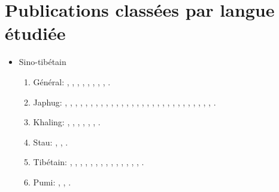 \documentclass[oneside,a4paper,11pt]{article}
\newcommand{\zh}[1]{{\cn #1}}
\newcommand{\lingua}[3]{#2}%
\begin{document}
\section{\lingua{By languages}{Publications classées par langue étudiée}{研究的语言}}
\begin{itemize}
\item \lingua{Sino-Tibetan}{Sino-tibétain}{汉藏语系}
\begin{enumerate}
\item \lingua{General}{Général}{总论}: \cite{jacques03s.houzhui}, \cite{jacques06morpho}, \cite{jacques07chang}, \cite{antonov12kumush}, \cite{jacques12agreement},    \cite{michaud-jacques12nasalite}, \cite{jacques16th}, \cite{jacques16polysynthetique}, \cite{jacques17rgy}.     
\item \lingua{Japhug}{Japhug}{茶堡嘉绒语}:  \cite{jacques04redupl},     \cite{jacques04these},   \cite{jacques07passif},  \cite{jacques07redupl}, \cite{jacques08},  \cite{jacques10gesar}, \cite{jacques10refl},  \cite{jacques10inverse},  \cite{jacques12incorp},   \cite{jacques12demotion},  \cite{jacques13harmonization},  \cite{jacques13tropative}, \cite{jacques14antipassive}, \cite{japhug14ideophones}, \cite{jacques14inverse}, \cite{jacques14linking}, \cite{jacques16comparative}, \cite{jacques15causative}, \cite{jacques15japhug}, \cite{jacques16relatives}, \cite{jacques16complementation}, \cite{jacques17sketch}, \cite{jacques17num}, \cite{jacques17comitative}, \cite{jacques17volitional}, \cite{jacques18ipa}, \cite{jacques18generic}, \cite{jacques18bipartite}, \cite{jacques19contact}, \cite{jacques19egophoric}.
\item \lingua{Khaling}{Khaling}{卡陵语}: \cite{jacques12khaling},  \cite{jacques13derivational.khaling}, \cite{jacques14auditory}, \cite{jacques15derivational.khaling}, \cite{jacques15khaling},  \cite{jacques16si}, \cite{jacques16tonogenesis}.
\item \lingua{Stau}{Stau}{道孚语}: \cite{antonov14rtau}, \cite{jacques14rtau}, \cite{jacques17stau}.
\item \lingua{Tibetan}{Tibétain}{藏语}:  \cite{jacques01dg}, \cite{jacques04thimphu}, \cite{jacques07naksatram},      \cite{jacques08debther},  \cite{jacques09wazur}, \cite{jacques09e},  \cite{jacques10zos},   \cite{jacques10ndr},  \cite{jacques11lingua},  \cite{jacques12internal},  \cite{jacques12transcription}, \cite{jacques13yod}, \cite{jacques14snom}, \cite{jacques14cone}, \cite{jacques19contact}.
\item \lingua{Pumi}{Pumi}{普米语}:  \cite{michaud10bonin}, \cite{jacques11pumi.tone}, \cite{jacques11lingua}.

\end{enumerate}
\end{itemize}
\end{document}
